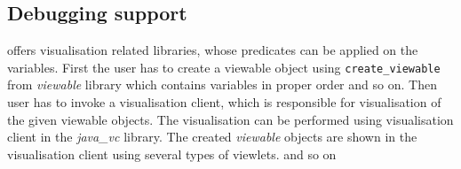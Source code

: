 \subsection{Debugging support}
\eclipse offers visualisation related libraries, whose predicates can be applied 
on the variables. First the user has to create a viewable object using \texttt{create_viewable}
from {\em viewable} library which contains variables in proper order and so on. Then
user has to invoke a visualisation client, which is responsible for visualisation of the 
given viewable objects. The visualisation can be performed using  visualisation client
in the {\em java_vc} library. The created {\em viewable} objects are shown in
the visualisation client using several types of viewlets. and so on 
